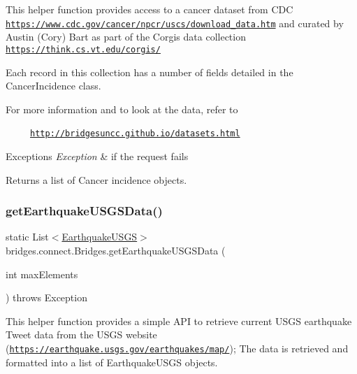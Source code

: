 This helper function provides access to a cancer dataset from C\+DC \href{https://www.cdc.gov/cancer/npcr/uscs/download_data.htm}{\tt https\+://www.\+cdc.\+gov/cancer/npcr/uscs/download\+\_\+data.\+htm} and curated by Austin (Cory) Bart as part of the Corgis data collection \href{https://think.cs.vt.edu/corgis/}{\tt https\+://think.\+cs.\+vt.\+edu/corgis/}

Each record in this collection has a number of fields detailed in the Cancer\+Incidence class.

For more information and to look at the data, refer to 

~~~~~\href{http://bridgesuncc.github.io/datasets.html}{\tt http\+://bridgesuncc.\+github.\+io/datasets.\+html} 


\begin{DoxyExceptions}{Exceptions}
{\em Exception} & if the request fails\\
\hline
\end{DoxyExceptions}
\begin{DoxyReturn}{Returns}
a list of Cancer incidence objects. 
\end{DoxyReturn}
\mbox{\label{classbridges_1_1connect_1_1_bridges_a58bef23cd12872c6ae5d7358b7485a2b}} 
\subsubsection{\texorpdfstring{get\+Earthquake\+U\+S\+G\+S\+Data()}{getEarthquakeUSGSData()}}
{\footnotesize\ttfamily static List$<$\mbox{\hyperlink{classbridges_1_1data__src__dependent_1_1_earthquake_u_s_g_s}{Earthquake\+U\+S\+GS}}$>$ bridges.\+connect.\+Bridges.\+get\+Earthquake\+U\+S\+G\+S\+Data (\begin{DoxyParamCaption}\item[{int}]{max\+Elements }\end{DoxyParamCaption}) throws Exception\hspace{0.3cm}{\ttfamily [static]}}

This helper function provides a simple A\+PI to retrieve current U\+S\+GS earthquake Tweet data from the U\+S\+GS website (\href{https://earthquake.usgs.gov/earthquakes/map/}{\tt https\+://earthquake.\+usgs.\+gov/earthquakes/map/}); The data is retrieved and formatted into a list of Earthquake\+U\+S\+GS objects.

